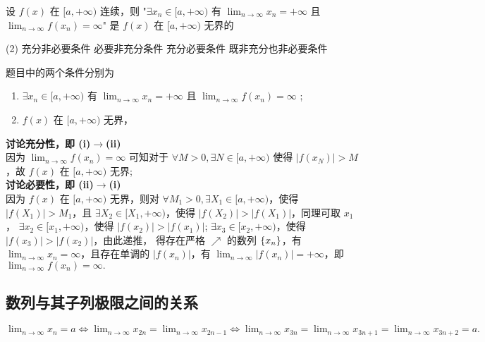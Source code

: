 \begin{example}
    设 $f(x)$ 在 $[a,+\infty)$ 连续，则 "$\exists x_n\in[a,+\infty)$ 有 $\displaystyle\lim_{n\to\infty}x_n=+\infty$ 且 $\displaystyle\lim_{n\to\infty}f(x_n)=\infty$" 是 $f(x)$ 在 $[a,+\infty)$ 无界的
    \begin{tasks}(2)
        \task 充分非必要条件
        \task 必要非充分条件
        \task 充分必要条件
        \task 既非充分也非必要条件
    \end{tasks}
\end{example}
\begin{solution}
    题目中的两个条件分别为
    \begin{enumerate}[label=(\roman{*})]
        \item $\exists x_n\in [a,+\infty)$ 有 $\displaystyle\lim_{n\to\infty}x_n=+\infty$ 且 $\displaystyle\lim_{n\to\infty}f(x_n)=\infty$ ;
        \item $f(x)$ 在 $[a,+\infty)$ 无界，
    \end{enumerate}
    \textbf{讨论充分性，即 (i)$\to$(ii)}\\
    因为 $\displaystyle\lim_{n\to\infty}f(x_n)=\infty$ 可知对于 $\forall M>0,\exists N\in [a,+\infty)$ 使得 $|f(x_N)|>M$，故 $f(x)$ 在 $[a,+\infty)$ 无界;\\
    \textbf{讨论必要性，即 (ii)$\to$(i)}\\
    因为 $f(x)$ 在 $[a,+\infty)$ 无界，则对 $\forall M_1>0,\exists X_1\in [a,+\infty)$，使得 $|f(X_1)|>M_1$，且 $\exists X_2\in [X_1,+\infty)$，使得 $|f(X_2)|>|f(X_1)|$，同理可取 $x_1$，
    $\exists x_2\in [x_1,+\infty)$，使得 $|f(x_2)|>|f(x_1)|$; $\exists x_3\in [x_2,+\infty)$，使得 $|f(x_3)|>|f(x_2)|$，由此递推，
    得存在严格 $\nearrow$ 的数列 $\qty{x_n}$，有 $\displaystyle\lim_{n\to\infty}x_n=\infty$，且存在单调的 $|f(x_n)|$，有 $\displaystyle\lim_{n\to\infty}|f(x_n)|=+\infty$，即 $\displaystyle\lim_{n\to\infty}f(x_n)=\infty.$
\end{solution}

\subsection{数列与其子列极限之间的关系}

\begin{theorem}
    \label{theRelationshipBetweenASequenceAndItsSubColumnLimits}
    $\displaystyle\lim_{n\to\infty}x_n=a\Leftrightarrow \lim_{n\to\infty}x_{2n}=\lim_{n\to\infty}x_{2n-1}\Leftrightarrow\lim_{n\to\infty}x_{3n}=\lim_{n\to\infty}x_{3n+1}=\lim_{n\to\infty}x_{3n+2}=a.$
\end{theorem}

